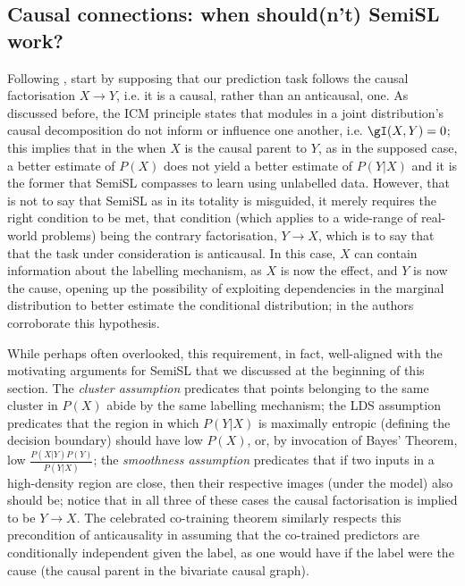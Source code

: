 \subsection{
  Causal connections: when should(n't) SemiSL work?
}\label{ssec:semisl-causality}
Following \cite{scholkopf2021toward}, start by supposing that our prediction task follows the
causal factorisation \( X \to Y\), i.e. it is a causal, rather than an anticausal, one.
%
As discussed before, the ICM principle states that modules in a joint distribution's causal
decomposition do not inform or influence one another, i.e. \(\gI(X, Y) = 0 \); this implies that in
the when \(X\) is the causal parent to \(Y\), as in the supposed case, a better estimate of
\(P(X)\) does not yield a better estimate of \(P(Y|X)\) and it is the former that SemiSL
compasses to learn using unlabelled data.
%
However, that is not to say that SemiSL as in its totality is misguided, it merely requires the
right condition to be met, that condition (which applies to a wide-range of real-world problems)
being the contrary factorisation, \(Y \to X \), which is to say that that the task under
consideration is anticausal.
%
In this case, \(X\) can contain information about the labelling mechanism, as \(X\) is now the
effect, and \(Y\) is now the cause, opening up the possibility of exploiting dependencies in the
marginal distribution to better estimate the conditional distribution; in
\cite{scholkopf2012causal} the authors corroborate this hypothesis.
%
 
While perhaps often overlooked, this requirement, in fact, well-aligned with the motivating
arguments for SemiSL that we discussed at the beginning of this section.
%
The \emph{cluster assumption} predicates that points belonging to the same cluster in \(P(X)\)
abide by the same labelling mechanism; 
%
the LDS assumption predicates that the region in which \(P(Y|X)\) is maximally entropic (defining
the decision boundary) should have low \(P(X)\), or, by invocation of Bayes' Theorem, low \( \frac{
P(X|Y)P(Y) }{ P(Y|X) } \); 
%
the \emph{smoothness assumption} predicates that if two inputs in a high-density region are close,
then their respective images (under the model) also should be;
%
notice that in all three of these cases the causal factorisation is implied to be \(Y \to X \).
%
The celebrated co-training theorem \citep{blum1998combining} similarly respects this precondition
of anticausality in assuming that the co-trained predictors are conditionally independent given the
label, as one would have if the label were the cause (the causal parent in the bivariate causal
graph).
%

